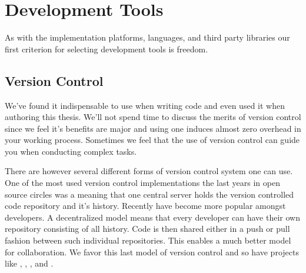 \section{Development Tools}

As with the implementation platforms, languages, and third party libraries
our first criterion for selecting development tools is freedom.

\subsection{Version Control}

We've found it indispensable to use  when writing code
and even used it when authoring this thesis. We'll not spend time to discuss
the merits of version control since we feel it's benefits are major and
using one induces almost zero overhead in your working process. Sometimes we
feel that the use of version control can guide you when conducting complex
tasks.

There are however several different forms of version control system one can
use. One of the most used version control implementations the last years
in open source circles was
%
\dash{}a  meaning that one central
server holds the version controlled code repository and it's history.%
Recently  have become more popular
amongst developers. A decentralized model means that every developer can have
their own repository consisting of all history.%
Code is then shared either in a push or pull fashion between such individual
repositories. This enables a much better model for collaboration.
We favor this last model of version control and so have projects
like , , ,
and .%

